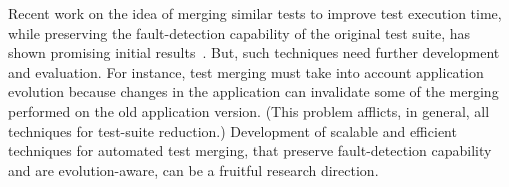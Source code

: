 Recent work on the idea of merging similar tests to improve test execution time,
while preserving the fault-detection capability of the original test suite, has
shown promising initial results~\cite{Devaki:2013}. But, such techniques need
further development and evaluation. For instance, test merging must take into
account application evolution because changes in the application can invalidate
some of the merging performed on the old application version. (This problem
afflicts, in general, all techniques for test-suite reduction.)  Development of
scalable and efficient techniques for automated test merging, that preserve
fault-detection capability and are evolution-aware, can be a fruitful research
direction.


